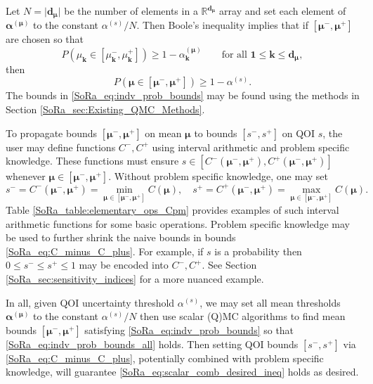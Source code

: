 \documentclass[graybox]{svmult}
\begin{document}
Let $N = \lvert \boldsymbol{d}_{\boldsymbol{\mu}} \rvert$ be the number of elements in a $\mathbb{R}^{\boldsymbol{d}_{\boldsymbol{\mu}}}$ array and set each element of $\boldsymbol{\alpha}^{(\boldsymbol{\mu})}$ to the constant $\alpha^{(s)}/ N$. Then Boole's inequality \cite{boole1847mathematical} implies that if $[\boldsymbol{\mu}^-,\boldsymbol{\mu}^+]$ are chosen so that
\begin{equation}
    P(\mu_{\boldsymbol{k}} \in [\mu_{\boldsymbol{k}}^-,\mu_{\boldsymbol{k}}^+]) \geq 1-\alpha_{\boldsymbol{k}}^{(\boldsymbol{\mu})}  \qquad \text{for all }\boldsymbol{1} \leq \boldsymbol{k} \leq \boldsymbol{d}_{\boldsymbol{\mu}},
    \label{SoRa_eq:indv_prob_bounds}
\end{equation}
then  
\begin{equation}
    P(\boldsymbol{\mu} \in [\boldsymbol{\mu}^-,\boldsymbol{\mu}^+]) \geq 1-\alpha^{(s)}.
    \label{SoRa_eq:indv_prob_bounds_all}
\end{equation}
The bounds in \eqref{SoRa_eq:indv_prob_bounds} may be found using the methods in Section \ref{SoRa_sec:Existing_QMC_Methods}.

To propagate bounds $[\boldsymbol{\mu}^-,\boldsymbol{\mu}^+]$ on mean $\boldsymbol{\mu}$ to bounds $[s^-,s^+]$ on QOI $s$, the user may define functions $C^-,C^+$ using interval arithmetic \cite{interval_analysis} and problem specific knowledge. These functions must ensure $s \in [C^-(\boldsymbol{\mu}^-,\boldsymbol{\mu}^+),C^+(\boldsymbol{\mu}^-,\boldsymbol{\mu}^+)]$ whenever $\boldsymbol{\mu} \in [\boldsymbol{\mu}^-,\boldsymbol{\mu}^+]$. Without problem specific knowledge, one may set 
\begin{equation}
    s^- = C^-(\boldsymbol{\mu}^-,\boldsymbol{\mu}^+) = \min_{\boldsymbol{\mu} \in [\boldsymbol{\mu}^-,\boldsymbol{\mu}^+]} C(\boldsymbol{\mu}), \quad 
    s^+= C^+(\boldsymbol{\mu}^-,\boldsymbol{\mu}^+) = \max_{\boldsymbol{\mu} \in [\boldsymbol{\mu}^-,\boldsymbol{\mu}^+]} C(\boldsymbol{\mu}).
    \label{SoRa_eq:C_minus_C_plus}
\end{equation}
Table \ref{SoRa_table:elementary_ops_Cpm} provides examples of such interval arithmetic functions for some basic operations. Problem specific knowledge may be used to further shrink the naive bounds in bounds \eqref{SoRa_eq:C_minus_C_plus}. For example, if $s$ is a probability then $0 \leq s^- \leq s^+ \leq 1$ may be encoded into $C^-,C^+$. See Section \ref{SoRa_sec:sensitivity_indices} for a more nuanced example. 

In all, given QOI uncertainty threshold $\alpha^{(s)}$, we may set all mean thresholds $\boldsymbol{\alpha}^{(\boldsymbol{\mu})}$ to the constant $\alpha^{(s)}/N$ then use scalar (Q)MC  algorithms to find mean bounds $[\boldsymbol{\mu}^-,\boldsymbol{\mu}^+]$ satisfying \eqref{SoRa_eq:indv_prob_bounds} so that \eqref{SoRa_eq:indv_prob_bounds_all} holds. Then setting QOI bounds $[s^-,s^+]$ via \eqref{SoRa_eq:C_minus_C_plus}, potentially combined with problem specific knowledge, will guarantee \eqref{SoRa_eq:scalar_comb_desired_ineq} holds as desired.
\end{document}
